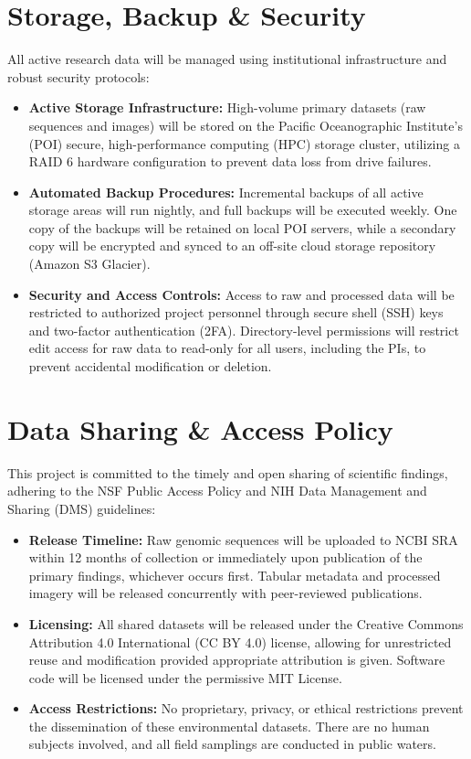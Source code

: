 \documentclass[10pt,letterpaper]{article}
\begin{document}
\section{Storage, Backup \& Security}
All active research data will be managed using institutional infrastructure and robust security protocols:
\begin{itemize}
    \item \textbf{Active Storage Infrastructure:} High-volume primary datasets (raw sequences and images) will be stored on the Pacific Oceanographic Institute's (POI) secure, high-performance computing (HPC) storage cluster, utilizing a RAID 6 hardware configuration to prevent data loss from drive failures.
    \item \textbf{Automated Backup Procedures:} Incremental backups of all active storage areas will run nightly, and full backups will be executed weekly. One copy of the backups will be retained on local POI servers, while a secondary copy will be encrypted and synced to an off-site cloud storage repository (Amazon S3 Glacier).
    \item \textbf{Security and Access Controls:} Access to raw and processed data will be restricted to authorized project personnel through secure shell (SSH) keys and two-factor authentication (2FA). Directory-level permissions will restrict edit access for raw data to read-only for all users, including the PIs, to prevent accidental modification or deletion.
\end{itemize}

\section{Data Sharing \& Access Policy}
This project is committed to the timely and open sharing of scientific findings, adhering to the NSF Public Access Policy and NIH Data Management and Sharing (DMS) guidelines:
\begin{itemize}
    \item \textbf{Release Timeline:} Raw genomic sequences will be uploaded to NCBI SRA within 12 months of collection or immediately upon publication of the primary findings, whichever occurs first. Tabular metadata and processed imagery will be released concurrently with peer-reviewed publications.
    \item \textbf{Licensing:} All shared datasets will be released under the Creative Commons Attribution 4.0 International (CC BY 4.0) license, allowing for unrestricted reuse and modification provided appropriate attribution is given. Software code will be licensed under the permissive MIT License.
    \item \textbf{Access Restrictions:} No proprietary, privacy, or ethical restrictions prevent the dissemination of these environmental datasets. There are no human subjects involved, and all field samplings are conducted in public waters.
\end{itemize}
\end{document}
